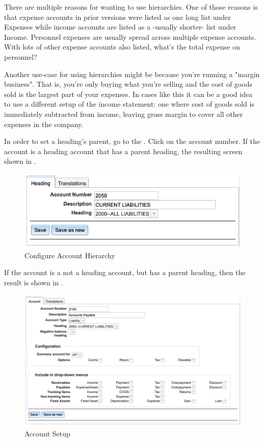There are multiple reasons for wanting to use hierarchies. One of those reasons is that expense accounts in prior versions were listed as one long list under Expenses while income accounts are listed as a -usually shorter- list under Income. Personnel expenses are usually spread across multiple expense accounts. With lots of other expense accounts also listed, what's the total expense on personnel?

Another use-case for using hierarchies might be because you're running a "margin business". That is, you're only buying what you're selling and the cost of goods sold is the largest part of your expenses. In cases like this it can be a good idea to use a different setup of the income statement: one where cost of goods sold is immediately subtracted from income, leaving gross margin to cover all other expenses in the company.


In order to set a heading's parent, go to the . Click on the account number. If the account is a heading account that has a parent heading, the resulting screen shown in .

\begin{figure}[H]
    \centering
    \includegraphics[width=\graphicswidth]{images/gl-coa-heading.png}
    \caption{Configure Account Hierarchy}
    \label{fig:config-coa-hierarchy}
\end{figure}

If the account is a not a heading account, but has a parent heading, then the result is shown in .

\begin{figure}[H]
    \centering
    \includegraphics[width=\linewidth]{images/gl-coa.png}
    \caption{Account Setup}
    \label{fig:coa-account-setup}
\end{figure}

